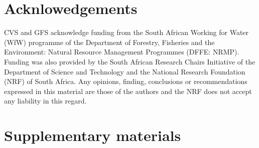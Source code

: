 \documentclass[
  authoryear,
  preprint,
  3p,
  onecolumn]{elsarticle}
\begin{document}
\hypertarget{acknlowedgements}{%
\section{Acknlowedgements}\label{acknlowedgements}}

CVS and GFS acknowledge funding from the South African Working for Water
(WfW) programme of the Department of Forestry, Fisheries and the
Environment: Natural Resource Management Programmes (DFFE: NRMP).
Funding was also provided by the South African Research Chairs
Initiative of the Department of Science and Technology and the National
Research Foundation (NRF) of South Africa. Any opinions, finding,
conclusions or recommendations expressed in this material are those of
the authors and the NRF does not accept any liability in this regard.

\hypertarget{supplementary-materials}{%
\section{Supplementary materials}\label{supplementary-materials}}


\renewcommand\refname{References}
  
\end{document}
